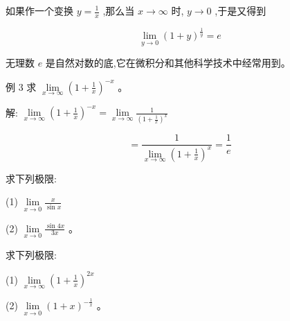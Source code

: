 \documentclass[lang=cn,newtx,12pt,scheme=chinese]{elegantbook}
\begin{document}
如果作一个变换 \(y = \frac{1}{x}\) ,那么当 \(x \rightarrow \infty\) 时, \(y \rightarrow 0\) ,于是又得到

\[
\mathop{\lim }\limits_{{y \rightarrow 0}}{\left( 1 + y\right) }^{\frac{1}{y}} = e
\]

无理数 \(e\) 是自然对数的底,它在微积分和其他科学技术中经常用到。

例 3 求 \(\mathop{\lim }\limits_{{x \rightarrow \infty }}{\left( 1 + \frac{1}{x}\right) }^{-x}\) 。

解: \(\mathop{\lim }\limits_{{x \rightarrow \infty }}{\left( 1 + \frac{1}{x}\right) }^{-x} = \mathop{\lim }\limits_{{x \rightarrow \infty }}\frac{1}{{\left( 1 + \frac{1}{x}\right) }^{x}}\)

\[
= \frac{1}{\mathop{\lim }\limits_{{x \rightarrow \infty }}{\left( 1 + \frac{1}{x}\right) }^{x}} = \frac{1}{e}
\]

\begin{problemset}[练习]

\item 求下列极限:

(1) \(\mathop{\lim }\limits_{{x \rightarrow 0}}\frac{x}{\sin x}\) 

(2) \(\mathop{\lim }\limits_{{x \rightarrow 0}}\frac{\sin {4x}}{3x}\) 。

\item 求下列极限:

(1) \(\mathop{\lim }\limits_{{x \rightarrow \infty }}{\left( 1 + \frac{1}{x}\right) }^{2x}\)

(2) \(\mathop{\lim }\limits_{{x \rightarrow 0}}{\left( 1 + x\right) }^{-\frac{1}{x}}\) 。
\end{problemset}
\end{document}
